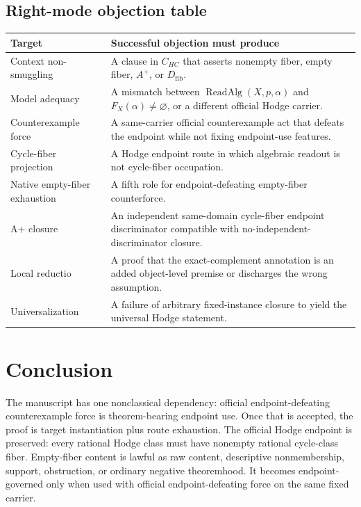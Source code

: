 \documentclass[11pt]{article}
\newcommand{\ReadAlg}{\operatorname{ReadAlg}}
\begin{document}
\subsection{Right-mode objection table}


\begin{longtable}{p{}p{}}
\toprule
Target & Successful objection must produce\\
\midrule
\endhead
Context non-smuggling & A clause in $C_{HC}$ that asserts nonempty fiber, empty fiber, $A^+$, or $D_{\mathrm{fib}}$.\\
Model adequacy & A mismatch between $\ReadAlg(X,p,\alpha)$ and $F_X(\alpha)\neq\varnothing$, or a different official Hodge carrier.\\
Counterexample force & A same-carrier official counterexample act that defeats the endpoint while not fixing endpoint-use features.\\
Cycle-fiber projection & A Hodge endpoint route in which algebraic readout is not cycle-fiber occupation.\\
Native empty-fiber exhaustion & A fifth role for endpoint-defeating empty-fiber counterforce.\\
A+ closure & An independent same-domain cycle-fiber endpoint discriminator compatible with no-independent-discriminator closure.\\
Local reductio & A proof that the exact-complement annotation is an added object-level premise or discharges the wrong assumption.\\
Universalization & A failure of arbitrary fixed-instance closure to yield the universal Hodge statement.\\
\bottomrule
\end{longtable}

\section{Conclusion}


The manuscript has one nonclassical dependency: official endpoint-defeating counterexample force is theorem-bearing endpoint use. Once that is accepted, the proof is target instantiation plus route exhaustion. The official Hodge endpoint is preserved: every rational Hodge class must have nonempty rational cycle-class fiber. Empty-fiber content is lawful as raw content, descriptive nonmembership, support, obstruction, or ordinary negative theoremhood. It becomes endpoint-governed only when used with official endpoint-defeating force on the same fixed carrier.
\end{document}
